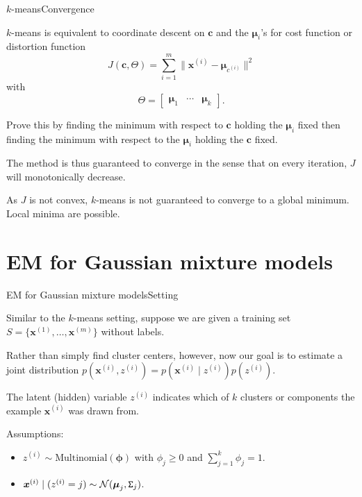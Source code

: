 \documentclass{beamer}
\renewcommand{\vec}[1]{\boldsymbol{#1}}
\newcommand{\mat}[1]{\mathtt{#1}}
\begin{document}
\begin{frame}{$k$-means}{Convergence}

  $k$-means is equivalent to \alert{coordinate descent} on $\vec{c}$ and
  the $\vec{\mu}_i$'s for cost function or \alert{distortion function}
  \[ J(\vec{c},\mat{\Theta}) = \sum_{i=1}^m \| \vec{x}^{(i)} - \vec{\mu}_{c^{(i)}} \|^2 \]
  with
  \[ \mat{\Theta} = \begin{bmatrix} \vec{\mu}_1 & \cdots & \vec{\mu}_k \end{bmatrix}. \]
 
  \medskip

  Prove this by finding the minimum with respect to $\vec{c}$ holding
  the $\vec{\mu}_i$ fixed then finding the minimum with respect to the
  $\vec{\mu}_i$ holding the $\vec{c}$ fixed.

  \medskip

  The method is thus guaranteed to converge in the sense that on every
  iteration, $J$ will monotonically decrease.

  \medskip

  As $J$ is not convex, $k$-means is not guaranteed to converge to a
  global minimum. Local minima are possible.
  
\end{frame}

\section{EM for Gaussian mixture models}

\begin{frame}{EM for Gaussian mixture models}{Setting}

  Similar to the $k$-means setting, suppose we are given a training set
  $S=\{\vec{x}^{(1)},\ldots,\vec{x}^{(m)}\}$ without labels.

  \medskip

  Rather than simply find cluster centers, however, now our goal is to
  estimate a joint distribution $p(\vec{x}^{(i)},z^{(i)}) =
  p(\vec{x}^{(i)}\mid z^{(i)})p(z^{(i)})$.

  \medskip

  The \alert{latent} (hidden) variable $z^{(i)}$ indicates
  \alert{which of $k$ clusters or components} the example
  $\vec{x}^{(i)}$ was drawn from.
  
  \medskip

  Assumptions:
  \begin{itemize}
  \item $z^{(i)} \sim \text{Multinomial}(\vec{\phi})$ with $\phi_j
    \ge 0$ and $\sum_{j=1}^k \phi_j = 1$.
  \item $\vec{x}^{(i)} \mid (z^{(i)} = j) \sim {\cal N}(\vec{\mu}_j,\mat{\Sigma}_j)$.
  \end{itemize}
    
\end{frame}
\end{document}
